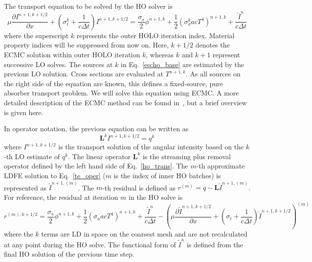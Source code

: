 \documentclass{mc2013}
\newcommand{\pderiv}[2]{\frac{\partial #1}{\partial #2}}
\newcommand{\B}[1]{\ensuremath{\mathbf{#1}}}
\begin{document}

The transport equation to be solved by the HO solver is
\begin{equation}\label{eq:ho_base}
\mu \pderiv{I^{n+1,k+1/2}}{x} + \left(\sigma_t^k + \frac{1}{c \Delta t }\right)
I^{n+1,k+1/2}
= \frac{\sigma_s}{2} \phi^{n+1,k} +\frac{1}{2} \left(\sigma_a^k a c T^4
\right)^{n+1,k} + \frac{\tilde I^n}{c\Delta t} 
\end{equation}
where the superscript $k$ represents the outer HOLO iteration index.  Material property indices will be
suppressed from now on.  Here, $k+1/2$ denotes the
ECMC solution within outer HOLO iteration $k$, whereas $k$ and $k+1$ represent successive LO
solves. The sources at $k$ in Eq.~\eqref{eq:ho_base} are estimated by the previous LO solution. Cross sections are
evaluated at $T^{n+1,k}$.  As all sources on the right side of the equation are known,
this defines a fixed-source, pure absorber transport problem.  We will solve
this equation using ECMC.  A more detailed description of the
ECMC method can be found in~\cite{jake_thesis}, but a brief overview is given here.

 In operator notation, the previous equation can be written as
\begin{equation}\label{te_oper}
\B L^k I^{n+1,k+1/2}  = q^{k}
\end{equation}
where $I^{n+1,k+1/2}$ is the transport solution of the angular intensity based on the
$k$-th LO estimate of $q^k$.
The linear operator $\B L^k$ is the streaming plus
removal operator defined by the left hand
side of Eq.~\eqref{ho_trans}.
The $m$-th approximate LDFE solution to Eq.~\eqref{te_oper} ($m$ is the index of inner HO
batches) is represented as
$\tilde{I}^{n+1,(m)}$.    
The $m$-th residual is defined as $r^{(m)} = q - \B L\tilde{I}^{n+1,(m)}.$ 
For reference, the residual at iteration $m$ in the HO solve
is
\begin{equation}\label{eq:resid}
r^{(m),k+1/2} = \frac{\sigma_s}{2} \phi^{n+1,k} +\frac{1}{2} \left(\sigma_a a c T^4
\right)^{n+1,k} + \frac{\tilde{I}^n}{c \Delta t } -
\left(\mu \pderiv{\tilde{I}^{n+1,k+1/2}}{x} +
\left(\sigma_t + \frac{1}{c \Delta t }\right) \tilde{I}^{n+1,k+1/2}\right)^{(m)}
\end{equation}
where the $k$ terms are LD in space on the coarsest mesh and are not recalculated at any point during
the HO solve. The functional form of $\tilde{I}^n$ is defined from the final HO
solution of the previous time step.  
\end{document}

